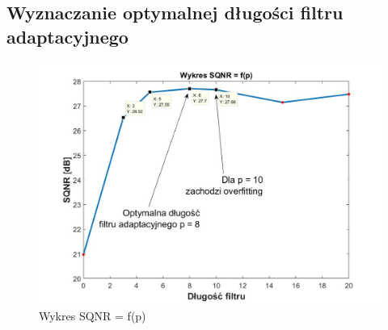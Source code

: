 \documentclass[12pt, a4paper, oneside]{article}
\begin{document}
\subsection{Wyznaczanie optymalnej długości filtru adaptacyjnego}
\begin{figure}[h]
\centering
\caption{Wykres SQNR = f(p)}
\includegraphics[scale=0.33]{f11.jpg}
\end{figure}
\end{document}
